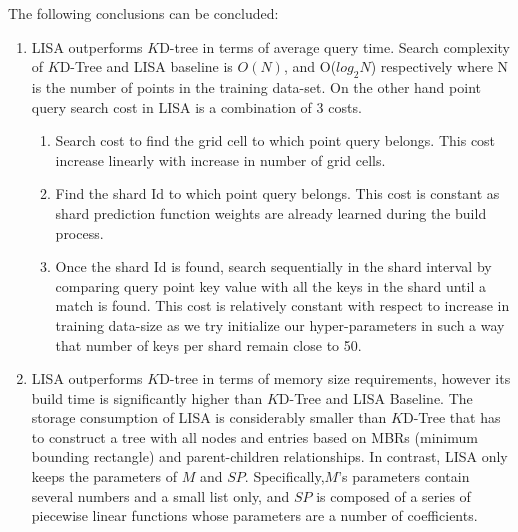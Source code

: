 \begin{mscconclusion}
The following conclusions can be concluded:

	\begin{enumerate}
    \item LISA outperforms $K$D-tree in terms of average query time. Search complexity of $K$D-Tree and LISA baseline is $O(N)$, and O($log_{2}N$) respectively where N is the number of points in the training data-set. On the other hand point query search cost in LISA is a combination of 3 costs.
    \begin{enumerate}
    \item Search cost to find the grid cell to which point query belongs. This cost increase linearly with increase in number of grid cells. 
    
    \item Find the shard Id to which point query belongs. This cost is constant as shard prediction function weights are already learned during the build process. 
    
    \item Once the shard Id is found, search sequentially in the shard interval by comparing query point key value with all the keys in the shard until a match is found. This cost is relatively constant with respect to increase in training data-size as we try initialize our hyper-parameters in such a way that number of keys per shard remain close to 50. 
\end{enumerate}
    
    \item LISA outperforms $K$D-tree in terms of memory size requirements, however its build time is significantly higher than $K$D-Tree and LISA Baseline. The storage consumption of LISA is considerably smaller than $K$D-Tree that has to construct a tree with all nodes and entries based on MBRs (minimum bounding rectangle)  and parent-children relationships. In contrast, LISA only keeps the parameters of $M$ and $SP$. Specifically,$M$’s parameters contain several numbers and a small list only, and $SP$ is composed of a series of piecewise linear functions whose parameters are a number of coefficients.
\end{enumerate}

\end{mscconclusion}

